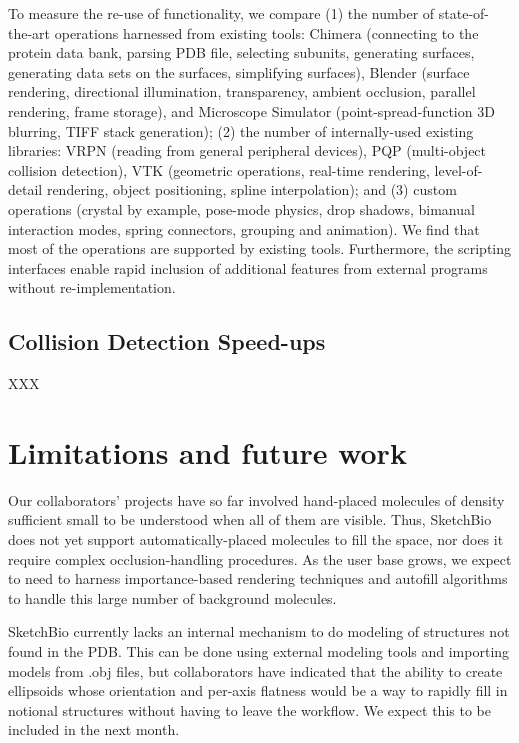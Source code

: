 \documentclass[twocolumn]{bmcart}%
\begin{document}
To measure the re-use of functionality, we compare (1) the number of state-of-the-art operations harnessed from existing tools: Chimera (connecting to the protein data bank, parsing PDB file, selecting subunits, generating surfaces, generating data sets on the surfaces, simplifying surfaces), Blender (surface rendering, directional illumination, transparency, ambient occlusion, parallel rendering, frame storage), and Microscope Simulator (point-spread-function 3D blurring, TIFF stack generation); (2) the number of internally-used existing libraries: VRPN (reading from general peripheral devices), PQP (multi-object collision detection), VTK (geometric operations, real-time rendering, level-of-detail rendering, object positioning, spline interpolation); and (3) custom operations (crystal by example, pose-mode physics, drop shadows, bimanual interaction modes, spring connectors, grouping and animation).  We find that most of the operations are supported by existing tools.  Furthermore, the scripting interfaces enable rapid inclusion of additional features from external programs without re-implementation.

\subsection*{Collision Detection Speed-ups}
XXX


\section*{Limitations and future work}
Our collaborators' projects have so far involved hand-placed molecules of density sufficient small to be understood when all of them are visible.  Thus, SketchBio does not yet support automatically-placed molecules to fill the space, nor does it require complex occlusion-handling procedures.  As the user base grows, we expect to need to harness importance-based rendering techniques and autofill algorithms to handle this large number of background molecules.

SketchBio currently lacks an internal mechanism to do modeling of structures not found in the PDB.  This can be done using external modeling tools and importing models from .obj files, but collaborators have indicated that the ability to create ellipsoids whose orientation and per-axis flatness would be a way to rapidly fill in notional structures without having to leave the workflow.  We expect this to be included in the next month.
\end{document}
